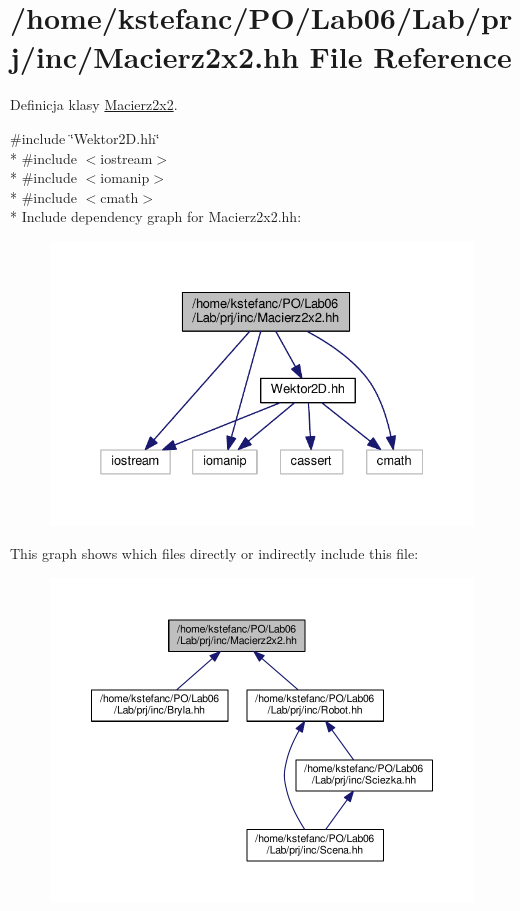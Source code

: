 \hypertarget{_macierz2x2_8hh}{\section{/home/kstefanc/\+P\+O/\+Lab06/\+Lab/prj/inc/\+Macierz2x2.hh File Reference}
\label{_macierz2x2_8hh}
}


Definicja klasy \hyperlink{class_macierz2x2}{Macierz2x2}.  


{\ttfamily \#include \char`\"{}Wektor2\+D.\+hh\char`\"{}}\\*
{\ttfamily \#include $<$iostream$>$}\\*
{\ttfamily \#include $<$iomanip$>$}\\*
{\ttfamily \#include $<$cmath$>$}\\*
Include dependency graph for Macierz2x2.\+hh\+:\nopagebreak
\begin{figure}[H]
\begin{center}
\leavevmode
\includegraphics[width=332pt]{_macierz2x2_8hh__incl}
\end{center}
\end{figure}
This graph shows which files directly or indirectly include this file\+:\nopagebreak
\begin{figure}[H]
\begin{center}
\leavevmode
\includegraphics[width=350pt]{_macierz2x2_8hh__dep__incl}
\end{center}
\end{figure}
